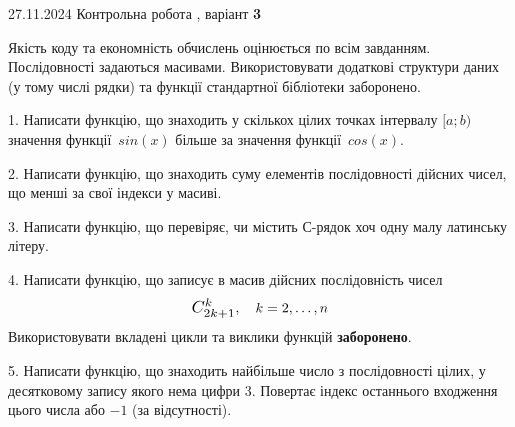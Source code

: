 \documentclass[12pt, ukrainian]{article}
\begin{document}
{{\begin {large}
\end{large}
\newpage
{{27.11.2024 Контрольна робота , варіант  \No \textbf { 3 }\par}}


{
Якість коду та економність обчислень оцінюється по всім завданням. Послідовності задаються масивами. Використовувати додаткові структури даних (у тому числі рядки) та функції стандартної бібліотеки заборонено.

\vspace{2mm}

\begin {large}
1. Написати функцію, що знаходить у скількох цілих точках інтервалу $[a; b)$ значення функції~$sin(x)$ більше за значення функції~$cos(x)$.

\vspace{2mm}


2. Написати функцію, що знаходить суму елементів послідовності дійсних чисел, що менші за свої індекси у масиві.

\vspace{2mm}


3. Написати функцію, що перевіряє, чи містить С-рядок хоч одну малу латинську літеру.

\vspace{2mm}


4. 
Написати функцію, що записує в масив дійсних послідовність чисел
$$\scalebox{1.2}{$C_{2k+1}^{k}$}, \quad k=2,\ldots,n$$
Використовувати вкладені цикли та виклики функцій \textbf{заборонено}.

\vspace{2mm}


5. Написати функцію, що знаходить найбільше число з послідовності цілих, у десятковому запису якого нема цифри 3. Повертає індекс останнього входження цього числа або $-1$ (за відсутності).

\vspace{2mm}


\end{large}}}}
\end{document}
